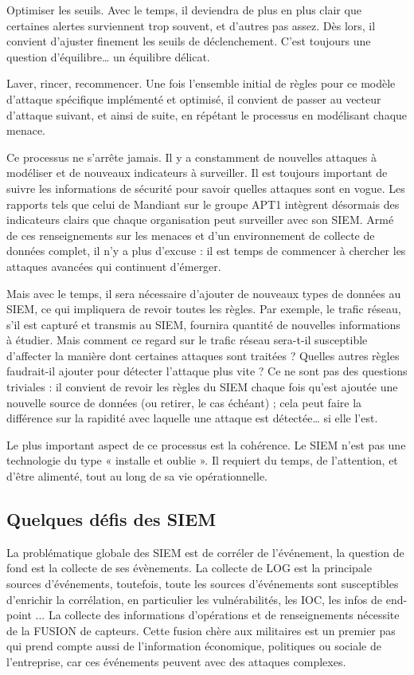 Optimiser les seuils. Avec le temps, il deviendra de plus en plus clair que certaines alertes surviennent trop souvent, et d’autres pas assez. Dès lors, il convient d’ajuster finement les seuils de déclenchement. C’est toujours une question d’équilibre… un équilibre délicat.

Laver, rincer, recommencer. Une fois l’ensemble initial de règles pour ce modèle d’attaque spécifique implémenté et optimisé, il convient de passer au vecteur d’attaque suivant, et ainsi de suite, en répétant le processus en modélisant chaque menace.

Ce processus ne s’arrête jamais. Il y a constamment de nouvelles attaques à modéliser et de nouveaux indicateurs à surveiller. Il est toujours important de suivre les informations de sécurité pour savoir quelles attaques sont en vogue. Les rapports tels que celui de Mandiant sur le groupe APT1 intègrent désormais des indicateurs clairs que chaque organisation peut surveiller avec son SIEM. Armé de ces renseignements sur les menaces et d’un environnement de collecte de données complet, il n’y a plus d’excuse : il est temps de commencer à chercher les attaques avancées qui continuent d’émerger.

Mais avec le temps, il sera nécessaire d’ajouter de nouveaux types de données au SIEM, ce qui impliquera de revoir toutes les règles. Par exemple, le trafic réseau, s’il est capturé et transmis au SIEM, fournira quantité de nouvelles informations à étudier. Mais comment ce regard sur le trafic réseau sera-t-il susceptible d’affecter la manière dont certaines attaques sont traitées ? Quelles autres règles faudrait-il ajouter pour détecter l’attaque plus vite ? Ce ne sont pas des questions triviales : il convient de revoir les règles du SIEM chaque fois qu’est ajoutée une nouvelle source de données (ou retirer, le cas échéant) ; cela peut faire la différence sur la rapidité avec laquelle une attaque est détectée… si elle l’est.

Le plus important aspect de ce processus est la cohérence. Le SIEM n’est pas une technologie du type « installe et oublie ». Il requiert du temps, de l’attention, et d’être alimenté, tout au long de sa vie opérationnelle.



\subsection{Quelques défis des SIEM	}

La problématique globale des SIEM est de corréler de l'événement, la question de fond est la collecte de ses évènements. La collecte de LOG est la principale sources d'événements, toutefois, toute les sources d'événements sont susceptibles d'enrichir la corrélation, en particulier les vulnérabilités, les IOC, les infos de end-point ...
La collecte des informations d'opérations et de renseignements nécessite de la FUSION de capteurs.  Cette fusion chère aux militaires est un premier pas qui prend compte aussi de l'information économique, politiques ou sociale de l'entreprise, car ces événements peuvent  avec des attaques complexes.
  
